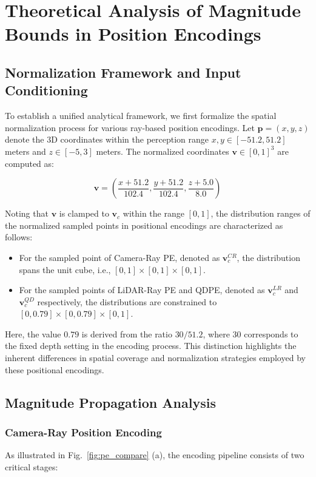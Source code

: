 \section{Theoretical Analysis of Magnitude Bounds in Position Encodings}
\label{sec:mag_analysis}

\subsection{Normalization Framework and Input Conditioning}
\label{subsec:normalization}
To establish a unified analytical framework, we first formalize the spatial normalization process for various ray-based position encodings. Let $\mathbf{p} = (x, y, z)$ denote the 3D coordinates within the perception range $x, y \in [-51.2, 51.2]$ meters and $z \in [-5, 3]$ meters. The normalized coordinates $\mathbf{v} \in [0, 1]^3$ are computed as:

\begin{equation}
    \mathbf{v} = \left( \frac{x + 51.2}{102.4}, \frac{y + 51.2}{102.4}, \frac{z + 5.0}{8.0} \right)
    \label{eq:normalization}
\end{equation}

Noting that $\mathbf{v}$ is clamped to $\mathbf{v}_c$ within the range $[0, 1]$, the distribution ranges of the normalized sampled points in positional encodings are characterized as follows:
\begin{itemize}
    \item For the sampled point of Camera-Ray PE, denoted as $\mathbf{v}_c^{CR}$, the distribution spans the unit cube, i.e., $[0, 1] \times [0, 1] \times [0, 1]$.
    \item For the sampled points of LiDAR-Ray PE and QDPE, denoted as $\mathbf{v}_c^{LR}$ and $\mathbf{v}_c^{QD}$ respectively, the distributions are constrained to $[0, 0.79] \times [0, 0.79] \times [0, 1]$.
\end{itemize}
Here, the value $0.79$ is derived from the ratio $30/51.2$, where $30$ corresponds to the fixed depth setting in the encoding process. This distinction highlights the inherent differences in spatial coverage and normalization strategies employed by these positional encodings.

\subsection{Magnitude Propagation Analysis}
\label{subsec:magnitude_propagation}

\subsubsection{Camera-Ray Position Encoding}
\label{subsubsec:camera_pe}
As illustrated in Fig.~\ref{fig:pe_compare} (a), the encoding pipeline consists of two critical stages:

